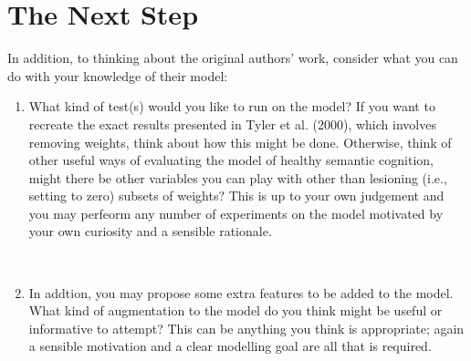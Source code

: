 \documentclass[a4paper,10pt]{article}
\begin{document}
\section{The Next Step}
In addition, to thinking about the original authors' work, consider what you can do with your knowledge of their model: 
\begin{enumerate}


 \item What kind of test(s) would you like to run on the model? If you want to recreate the exact results presented in Tyler et al. (2000), which involves removing weights, think about how this might be done. Otherwise, think of other useful ways of evaluating the model of healthy semantic cognition, might there be other variables you can play with other than lesioning (i.e., setting to zero) subsets of weights? This is up to your own judgement and you may perfeorm any number of  experiments on the model motivated by your own curiosity and a sensible rationale. 
 
\ \\

\item In addtion, you may propose some extra features to be added to the model. What kind of augmentation to the model do you think might be useful or informative to attempt? This can be anything you think is appropriate; again a sensible motivation and a clear modelling goal are all that is required.
\end{enumerate}
\end{document}
